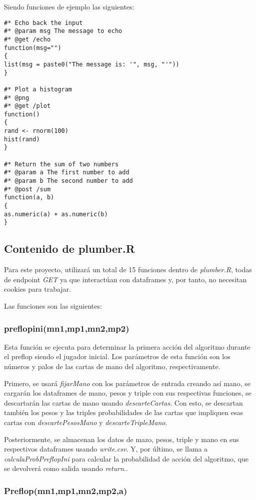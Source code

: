 Siendo funciones de ejemplo las siguientes:

\begin{verbatim}
#* Echo back the input
#* @param msg The message to echo
#* @get /echo
function(msg="")
{
list(msg = paste0("The message is: '", msg, "'"))
}

#* Plot a histogram
#* @png
#* @get /plot
function()
{
rand <- rnorm(100)
hist(rand)
}

#* Return the sum of two numbers
#* @param a The first number to add
#* @param b The second number to add
#* @post /sum
function(a, b)
{
as.numeric(a) + as.numeric(b)
}
\end{verbatim}

\subsection{Contenido de plumber.R}
Para este proyecto, utilizará un total de 15 funciones dentro de \textit{plumber.R}, todas de endpoint \textit{GET} ya que interactúan con dataframes y, por tanto, no necesitan cookies para trabajar.

Las funciones son las siguientes:

\subsubsection{preflopini(mn1,mp1,mn2,mp2)}

Esta función se ejecuta para determinar la primera acción del algoritmo durante el preflop siendo el jugador inicial. Los parámetros de esta función son los números y palos de las cartas de mano del algoritmo, respectivamente. 

Primero, se usará \textit{fijarMano} con los parámetros de entrada creando así mano, se cargarán los dataframes de mano, pesos y triple con sus respectivas funciones, se descartarán las cartas de mano usando \textit{descarteCartas}. Con esto, se descartan también los pesos y las triples probabilidades de las cartas que impliquen esas cartas con \textit{descartePesosMano} y \textit{descarteTripleMano}. 

Posteriormente, se almacenan los datos de mazo, pesos, triple y mano en sus respectivos dataframes usando \textit{write.csv}. Y, por último, se llama a \textit{calculaProbPreflopIni} para calcular la probabilidad de acción del algoritmo, que se devolverá como salida usando \textit{return}..

\subsubsection{Preflop(mn1,mp1,mn2,mp2,a)}

